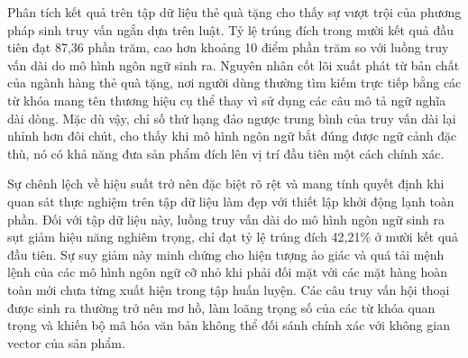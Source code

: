 \begin{table}[H]
\centering
\caption{So sánh hiệu suất truy xuất giữa hai phương pháp sinh truy vấn}
\label{tab:query_eval}
\renewcommand{\arraystretch}{1.2}
\end{table}

Phân tích kết quả trên tập dữ liệu thẻ quà tặng cho thấy sự vượt trội của phương pháp sinh truy vấn ngắn dựa trên luật. Tỷ lệ trúng đích trong mười kết quả đầu tiên đạt 87,36 phần trăm, cao hơn khoảng 10 điểm phần trăm so với luồng truy vấn dài do mô hình ngôn ngữ sinh ra. Nguyên nhân cốt lõi xuất phát từ bản chất của ngành hàng thẻ quà tặng, nơi người dùng thường tìm kiếm trực tiếp bằng các từ khóa mang tên thương hiệu cụ thể thay vì sử dụng các câu mô tả ngữ nghĩa dài dòng. Mặc dù vậy, chỉ số thứ hạng đảo ngược trung bình của truy vấn dài lại nhỉnh hơn đôi chút, cho thấy khi mô hình ngôn ngữ bắt đúng được ngữ cảnh đặc thù, nó có khả năng đưa sản phẩm đích lên vị trí đầu tiên một cách chính xác.

Sự chênh lệch về hiệu suất trở nên đặc biệt rõ rệt và mang tính quyết định khi quan sát thực nghiệm trên tập dữ liệu làm đẹp với thiết lập khởi động lạnh toàn phần. Đối với tập dữ liệu này, luồng truy vấn dài do mô hình ngôn ngữ sinh ra sụt giảm hiệu năng nghiêm trọng, chỉ đạt tỷ lệ trúng đích 42,21\% ở mười kết quả đầu tiên. Sự suy giảm này minh chứng cho hiện tượng ảo giác và quá tải mệnh lệnh của các mô hình ngôn ngữ cỡ nhỏ khi phải đối mặt với các mặt hàng hoàn toàn mới chưa từng xuất hiện trong tập huấn luyện. Các câu truy vấn hội thoại được sinh ra thường trở nên mơ hồ, làm loãng trọng số của các từ khóa quan trọng và khiến bộ mã hóa văn bản không thể đối sánh chính xác với không gian vector của sản phẩm.

